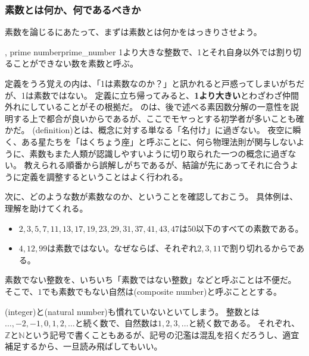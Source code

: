 \subsubsection{素数とは何か、何であるべきか}
素数を論じるにあたって、まずは素数とは何かをはっきりさせよう。

\begin{Defi}{, prime number}{prime_number}
1より大きな整数で、1とそれ自身以外では割り切ることができない数を素数と呼ぶ。
\end{Defi}

定義をうろ覚えの内は、「1は素数なのか？」と訊かれると戸惑ってしまいがちだが、1は素数ではない。
定義に立ち帰ってみると、\textbf{1より大きい}とわざわざ仲間外れにしていることがその根拠だ。
のは、後で述べる素因数分解の一意性を説明する上で都合が良いからであるが、ここでモヤっとする初学者が多いことも確かだ。
(definition)とは、概念に対する単なる「名付け」に過ぎない。
夜空に瞬く、ある星たちを「はくちょう座」と呼ぶことに、何ら物理法則が関与しないように、素数もまた人類が認識しやすいように切り取られた一つの概念に過ぎない。
教えられる順番から誤解しがちであるが、結論が先にあってそれに合うように定義を調整するということはよく行われる。

次に、どのような数が素数なのか、ということを確認しておこう。
具体例は、理解を助けてくれる。

\begin{Exam}{}{}\;
\begin{itemize}
 \item $2, 3, 5, 7, 11, 13, 17, 19, 23, 29, 31, 37, 41, 43, 47$は50以下のすべての素数である。
 \item $4, 12, 99$は素数ではない。なぜならば、それぞれ$2, 3, 11$で割り切れるからである。
\end{itemize}
\end{Exam}

素数でない整数を、いちいち「素数ではない整数」などと呼ぶことは不便だ。
そこで、$1$でも素数でもない自然は(composite number)と呼ぶこととする。

(integer)と(natural number)も慣れていないといてしまう。
整数とは$\ldots,-2,-1,0,1,2,\ldots$と続く数で、自然数は$1,2,3,\ldots$と続く数である。
それぞれ、$\mathbb{Z}$と$\mathbb{N}$という記号で書くこともあるが、記号の氾濫は混乱を招くだろうし、適宜補足するから、一旦読み飛ばしてもいい。

